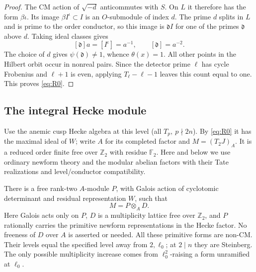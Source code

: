 \begin{proof}
The CM action of \(\sqrt{-d}\) anticommutes with \(S\). On \(L\)
it therefore has the form \(\beta\iota\). Its image
\(\beta I^\iota\subset I\) is an \(O\)-submodule of index \(d\).
The prime \(d\) splits in \(L\) and is prime to the order
conductor, so this image is \(\mathfrak d I\) for one of the
primes \(\mathfrak d\) above \(d\). Taking ideal classes gives
\[
 [\mathfrak d]a=[I^\iota]=a^{-1},\qquad
                         [\mathfrak d]=a^{-2}.
\]
The choice of \(d\) gives \(\psi(\mathfrak d)\ne1\), whence
\(\theta(x)=1\). All other points in the Hilbert orbit occur in
nonreal pairs. Since the detector prime \(\ell\) has cycle
Frobenius and \(\ell+1\) is even, applying
\(T_\ell-\ell-1\) leaves this count equal to one. This proves
\eqref{eq:R0}.
\end{proof}

\subsection{The integral Hecke module}

Use the anemic cusp Hecke algebra at this level (all \(T_p,\ p\nmid2n\)). By \eqref{eq:R0} it has the maximal ideal of \(W\); write \(A\) for its completed factor and \(M=(T_2J)_A\). It is a reduced order finite free over \(\mathbb Z_2\) with residue \(\mathbb F_2\). Here and below we use ordinary newform theory and the modular abelian factors with their Tate realizations and level/conductor compatibility. 
\begin{lemma}\label{real:packet}
There is a free rank-two \(A\)-module \(P\), with Galois action of
cyclotomic determinant and residual representation \(W\), such that
\begin{equation}\label{real:morita}
 M=P\otimes_A D.
\end{equation}
Here Galois acts only on \(P\), \(D\) is a multiplicity lattice free
over \(\mathbb Z_2\), and \(P\) rationally carries the primitive
newform representations in the Hecke factor. No freeness of \(D\)
over \(A\) is asserted or needed.
All these primitive forms are non-CM. Their levels equal the specified
level away from \(2,\ell_0\); at \(2\mid n\) they are Steinberg.
The only possible multiplicity increase comes from
\(\ell_0^2\)-raising a form unramified at \(\ell_0\).
\end{lemma}

